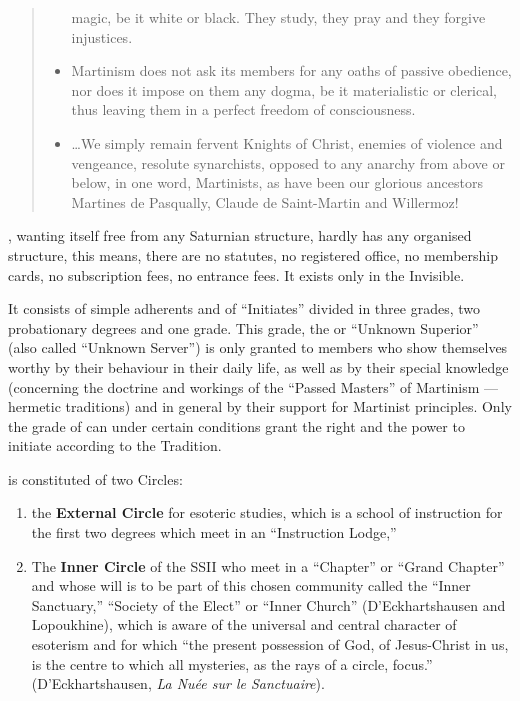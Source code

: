 \begin{quote}
\begin{itemize}
magic, be it white or black. They study, they pray and they forgive injustices.
    \item Martinism does not ask its members for any oaths of passive obedience, nor does
it impose on them any dogma, be it materialistic or clerical, thus leaving them in a
perfect freedom of consciousness.
    \item \ldots We simply remain fervent Knights of
Christ, enemies of violence and vengeance, resolute synarchists, opposed to any
anarchy from above or below, in one word, Martinists, as have been our glorious
ancestors Martines de Pasqually, Claude de Saint-Martin and Willermoz!
\end{itemize}
\end{quote}

\mouplong{}, wanting itself free from any Saturnian structure, hardly has any organised structure, this means, there are no statutes, no registered office, no membership cards, no subscription fees, no entrance fees. It exists only in the Invisible.

It consists of simple adherents and of ``Initiates'' divided in three grades, two
probationary degrees and one grade. This grade, the \si{} or ``Unknown
Superior'' (also called ``Unknown Server'') is only granted to members who show
themselves worthy by their behaviour in their daily life, as well as by their special
knowledge (concerning the doctrine and workings of the ``Passed Masters'' of
Martinism --- hermetic traditions) and in general by their support for Martinist
principles. Only the grade of \si{} can under certain conditions grant the right
and the power to initiate according to the Tradition.

\moup{} is constituted of two Circles:

\begin{enumerate}[label=\alph*)]
    \item the \textbf{External Circle} for esoteric studies, which is a school of instruction for the first two degrees which meet in an ``Instruction Lodge,''
    \item The \textbf{Inner Circle} of the SS\hexdot{}II\hexdot{} who meet in a ``Chapter'' or ``Grand Chapter'' and whose will is to be part of this chosen community called the ``Inner Sanctuary,'' ``Society of the Elect'' or ``Inner Church'' (D’Eckhartshausen and Lopoukhine), which is aware of the universal and central character of esoterism and for which ``the present possession of God, of Jesus-Christ in us, is the centre to which all mysteries, as the rays of a circle, focus.'' (D’Eckhartshausen, \textit{La Nuée sur le Sanctuaire}).
\end{enumerate}

